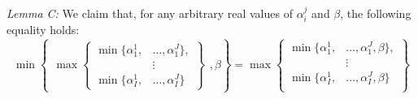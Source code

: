 \documentclass{article} %
\begin{document}
\textit{Lemma C:} We claim that, for any arbitrary real values of $\alpha^j_i$ and $\beta$, the following equality holds:
\[
\min
\left\{
  \begin{aligned}
    \max\left\{
      \begin{aligned}
        \min\{\alpha_1^1,&\ldots,\alpha_1^J\}, \\
        &\vdots \\
        \min\{\alpha_I^1,&\ldots,\alpha_I^J\}
      \end{aligned}
    \right\}
  \end{aligned}
  , \beta
\right\}
=
\max\left\{
  \begin{aligned}
    \min\{\alpha_1^1,&\ldots,\alpha_1^J,\beta\}, \\
    &\vdots \\
    \min\{\alpha_I^1,&\ldots,\alpha_I^J,\beta\} \\
  \end{aligned}
\right\}
\]
\end{document}

